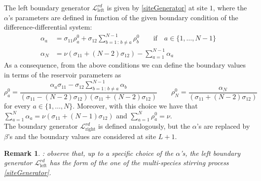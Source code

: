 \documentclass[10pt]{article}
\numberwithin{equation}{section}
\numberwithin{equation}{subsection}
\newtheorem{remark}{Remark}
\begin{document}
The left boundary generator $\mathcal{L}_{\text{left}}^{rd}$ is given by \eqref{siteGenerator} at site $1$,
where the $\alpha$'s parameters are defined in function of the given boundary condition of the difference-differential system:
\begin{equation}\label{boundaryParamRD}
	\begin{split}
		\alpha_{a}&=\sigma_{11}\rho_{a}^{0}+\sigma_{12}\sum_{b=1\,:\,b\neq a}^{N-1}\rho_{b}^{0}\qquad \text{if} \quad a\in \{1,\ldots,N-1\}\\
		\alpha_{N}&=\nu\left(\sigma_{11}+(N-2)\sigma_{12}\right)-\sum_{a=1}^{N-1}\alpha_{a}
	\end{split}
\end{equation}
As a consequence, from the above conditions we can define the boundary values in terms of the reservoir parameters as
\begin{equation}
	\rho_{a}^{0}=\frac{\alpha_{a}\sigma_{11}-\sigma_{12}\sum_{b=1\,:\,b\neq a}^{N-1}\alpha_{b}}{(\sigma_{11}-(N-2)\sigma_{12})(\sigma_{11}+(N-2)\sigma_{12})}\qquad \rho_{N}^{0}=\frac{\alpha_{N}}{(\sigma_{11}+(N-2)\sigma_{12})}
\end{equation}
for every $a\in\{1,\ldots,N\}$. Moreover, with this choice we have that $\sum_{a=1}^{N}\alpha_{a}=\nu(\sigma_{11}+(N-1)\sigma_{12})$ and $\sum_{a=1}^{N}\rho_{a}^{0}=\nu$. \\
The boundary generator $\mathcal{L}_{\text{right}}^{rd}$ is defined analogously, but the $\alpha$'s are replaced by $\beta$'s and the boundary values are considered at site $L+1$.
\begin{remark}: observe that, up to a specific choice of the $\alpha$'s, the left boundary generator $\mathcal{L}_{\text{left}}^{rd}$ has the form of the one of the multi-species stirring process \eqref{siteGenerator}. 
\end{remark}
\end{document}
